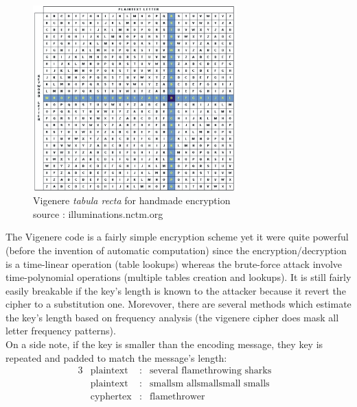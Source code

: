 \begin{figure}[ht!]
    \centering
        \includegraphics[width=0.7\textwidth]{images/vigenere}
	\caption{Vigenere \emph{tabula recta} for handmade encryption\\ source : illuminations.nctm.org}
	\label{fig:TabulaRecta}
\end{figure}

The Vigenere code is a fairly simple encryption scheme yet it were quite powerful (before the invention of automatic computation) since the encryption/decryption is a time-linear operation (table lookups) whereas the brute-force attack involve time-polynomial operations (multiple tables creation and lookups). It is still fairly easily breakable if the key's length is known to the attacker because it revert the cipher to a substitution one. Morevover, there are several methods which estimate the key's length based on frequency analysis (the vigenere cipher does mask all letter frequency patterns).\\





On a side note, if the key is smaller than the encoding message, they key is repeated and padded to match the message's length:
\begin{alignat*}{3}
    &\text{plaintext}   & : & \text{several flamethrowing sharks}&  \\
    &\text{plaintext}   & : & \text{smallsm allsmallsmall smalls}&  \\
    &\text{cyphertex}   & : & \text{flamethrower}&  \\ 
\end{alignat*}


